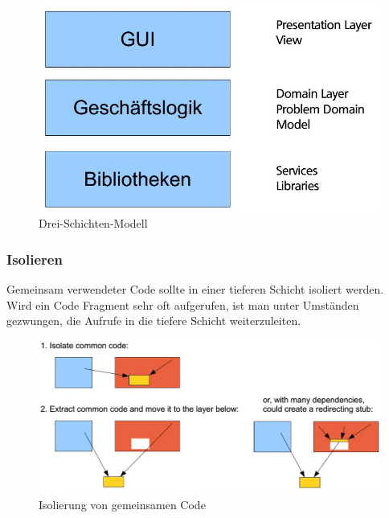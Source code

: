 \begin{figure}[h]
\centering
\includegraphics[width=0.35\linewidth]{images/three_tier_architecture}
\caption{Drei-Schichten-Modell}
\label{fig:threetierarchitecture}
\end{figure}

\subsubsection{Isolieren}
Gemeinsam verwendeter Code sollte in einer tieferen Schicht isoliert werden. Wird ein Code Fragment sehr oft aufgerufen, ist man unter Umständen gezwungen, die Aufrufe in die tiefere Schicht weiterzuleiten.
\begin{figure}[h!]
	\centering
	\includegraphics[width=0.7\linewidth]{images/layer_isolation}
	\caption{Isolierung von gemeinsamen Code}
	\label{fig:layerisolation}
\end{figure}

